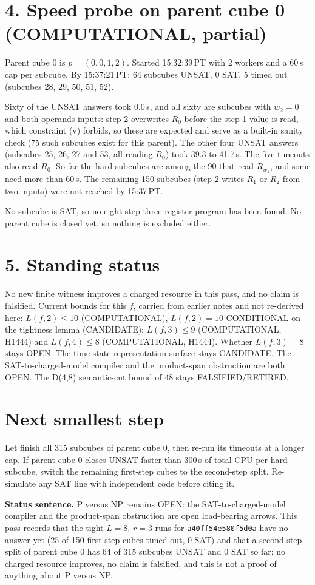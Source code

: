 \documentclass[11pt]{article}
\begin{document}
\section*{4. Speed probe on parent cube 0 (COMPUTATIONAL, partial)}
Parent cube 0 is $p=(0,0,1,2)$. Started 15:32:39\,PT with 2 workers and a 60\,s cap per subcube. By 15:37:21\,PT: 64 subcubes UNSAT, 0 SAT, 5 timed out (subcubes 28, 29, 50, 51, 52).

Sixty of the UNSAT answers took 0.0\,s, and all sixty are subcubes with $w_2=0$ and both operands inputs: step 2 overwrites $R_0$ before the step-1 value is read, which constraint (v) forbids, so these are expected and serve as a built-in sanity check (75 such subcubes exist for this parent). The other four UNSAT answers (subcubes 25, 26, 27 and 53, all reading $R_0$) took 39.3 to 41.7\,s. The five timeouts also read $R_0$. So far the hard subcubes are among the 90 that read $R_{w_1}$, and some need more than 60\,s. The remaining 150 subcubes (step 2 writes $R_1$ or $R_2$ from two inputs) were not reached by 15:37\,PT.

No subcube is SAT, so no eight-step three-register program has been found. No parent cube is closed yet, so nothing is excluded either.

\section*{5. Standing status}
No new finite witness improves a charged resource in this pass, and no claim is falsified. Current bounds for this $f$, carried from earlier notes and not re-derived here: $L(f,2)\le 10$ (COMPUTATIONAL), $L(f,2)=10$ CONDITIONAL on the tightness lemma (CANDIDATE); $L(f,3)\le 9$ (COMPUTATIONAL, H1444) and $L(f,4)\le 8$ (COMPUTATIONAL, H1444). Whether $L(f,3)=8$ stays OPEN. The time-state-representation surface stays CANDIDATE. The SAT-to-charged-model compiler and the product-span obstruction are both OPEN. The D(4,8) semantic-cut bound of 48 stays FALSIFIED/RETIRED.

\section*{Next smallest step}
Let  finish all 315 subcubes of parent cube 0, then re-run its timeouts at a longer cap. If parent cube 0 closes UNSAT faster than 300\,s of total CPU per hard subcube, switch the remaining first-step cubes to the second-step split. Re-simulate any SAT line with independent code before citing it.

\bigskip
\noindent\textbf{Status sentence.} P versus NP remains OPEN: the SAT-to-charged-model compiler and the product-span obstruction are open load-bearing arrows. This pass records that the tight $L=8$, $r=3$ runs for \texttt{a40ff54e580f5d0a} have no answer yet (25 of 150 first-step cubes timed out, 0 SAT) and that a second-step split of parent cube 0 has 64 of 315 subcubes UNSAT and 0 SAT so far; no charged resource improves, no claim is falsified, and this is not a proof of anything about P versus NP.
\end{document}
